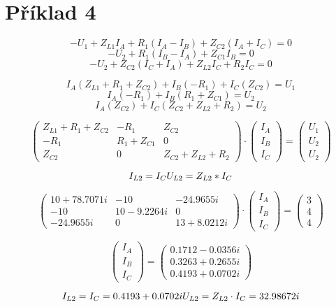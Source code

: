 \section{Příklad 4}

$$
  -U_1 + Z_{L1} I_A + R_1 (I_A - I_B) + Z_{C2} (I_A + I_C) = 0
$$
$$
  -U_2 + R_1 (I_B - I_A) + Z_{C1} I_B = 0
$$
$$
  -U_2 + Z_{C2} (I_C + I_A) + Z_{L2} I_C + R_2 I_C = 0
$$

$$
  I_A (Z_{L1} + R_1 + Z_{C2}) + I_B (-R_1) + I_C (Z_{C2}) = U_1
$$
$$
  I_A (-R_1) + I_B (R_1 + Z_{C1}) = U_2
$$
$$
  I_A (Z_{C2}) + I_C (Z_{C2} + Z_{L2} + R_2) = U_2
$$

$$
  \begin{pmatrix}
    Z_{L1}+R_1+Z_{C2} & -R_1       & Z_{C2}            \\
    -R_1              & R_1+Z_{C1} & 0                 \\
    Z_{C2}            & 0          & Z_{C2}+Z_{L2}+R_2
  \end{pmatrix}
  \cdot
  \begin{pmatrix}
    I_A \\
    I_B \\
    I_C
  \end{pmatrix}
  =
  \begin{pmatrix}
    U_1 \\
    U_2 \\
    U_2
  \end{pmatrix}
$$

$$
  I_{L2} = I_C \\
  U_{L2} = Z_{L2} * I_C
$$

$$
  \begin{pmatrix}
    10 + 78.7071i & -10         & -24.9655i    \\
    -10           & 10 -9.2264i & 0            \\
    -24.9655i     & 0           & 13 + 8.0212i
  \end{pmatrix}
  \cdot
  \begin{pmatrix}
    I_A \\
    I_B \\
    I_C
  \end{pmatrix}
  =
  \begin{pmatrix}
    3 \\
    4 \\
    4
  \end{pmatrix}
$$

$$
  \begin{pmatrix}
    I_A \\
    I_B \\
    I_C
  \end{pmatrix}
  =
  \begin{pmatrix}
    0.1712 - 0.0356i \\
    0.3263 + 0.2655i \\
    0.4193 + 0.0702i
  \end{pmatrix}
$$


$$
  I_{L2} = I_C = 0.4193 + 0.0702i \\
  U_{L2} = Z_{L2} \cdot I_C = 32.98672i
$$
